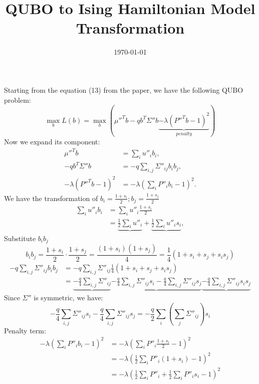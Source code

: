 \documentclass{article}
\title{QUBO to Ising Hamiltonian Model Transformation}
\author{}
\date{\today}
\begin{document}
\maketitle
Starting from the equation (13) from the paper, we have the following QUBO problem:
\begin{equation}
	\max_{b} L(b) = \max_{b} \left(\mu''^Tb -qb^T\Sigma''b \underbrace{- \lambda(P''^T b-1)^2}_{penalty}\right)
\end{equation}
Now we expand its component:
\begin{align}
	\mu''^Tb              & = \sum_{i}^{} u''_i b_i,                             \\
	-qb^T\Sigma''b        & = -q \sum_{i,j}^{} \Sigma''_{ij} b_i b_j,            \\
	-\lambda(P''^T b-1)^2 & = -\lambda \left(\sum_{i}^{} P''_i b_i - 1\right)^2.
\end{align}
We have the transformation of \(b_i = \frac{1+s_i}{2}; b_j = \frac{1+s_j}{2}\)
\begin{align}
	\sum_{i}^{} u''_i b_i & = \sum_{i}^{} u''_i \frac{1+s_i}{2}                                  \\
	                      & = \underbrace{\frac{1}{2} \sum_{i}^{} u''_i} + \underbrace{\frac{1}{2} \sum_{i}^{} u''_i s_i}, 
\end{align}
Substitute \(b_ib_j\)
\begin{equation}
	b_ib_j = \frac{1+s_i}{2} \cdot \frac{1+s_j}{2}  = \frac{(1+s_i)(1+s_j)}{4} = \frac{1}{4}(1 + s_i + s_j + s_is_j)
\end{equation}
\begin{align}
	-q \sum_{i,j}^{} \Sigma''_{ij} b_i b_j & = -q \sum_{i,j}^{} \Sigma''_{ij} \frac{1}{4}(1 + s_i + s_j + s_is_j)                                                                                                                   \\
	                                       & = \underbrace{-\frac{q}{4} \sum_{i,j}^{} \Sigma''_{ij}} \underbrace{-\frac{q}{4} \sum_{i,j}^{} \Sigma''_{ij} s_i - \frac{q}{4} \sum_{i,j}^{} \Sigma''_{ij} s_j} \underbrace{- \frac{q}{4} \sum_{i,j}^{} \Sigma''_{ij} s_is_j}
\end{align}
Since \(\Sigma''\) is symmetric, we have:
\begin{equation}
	-\frac{q}{4} \sum_{i,j}^{} \Sigma''_{ij} s_i -\frac{q}{4} \sum_{i,j}^{} \Sigma''_{ij} s_j = -\frac{q}{2} \sum_{i}^{} \left(\sum_{j}^{}\Sigma''_{ij}\right) s_i
\end{equation}
Penalty term:
\begin{align}
    -\lambda \left(\sum_{i}^{} P''_i b_i - 1\right)^2 &= -\lambda \left(\sum_{i}^{} P''_i \frac{1+s_i}{2} - 1\right)^2 \\
    &= -\lambda \left(\frac{1}{2} \sum_{i}^{}P''_i(1+s_i) -1\right)^2 \\
    &= -\lambda \left(\frac{1}{2} \sum_{i}^{}P''_i + \frac{1}{2} \sum_{i}^{}P''_i s_i - 1\right)^2 
\end{align}
\end{document}
